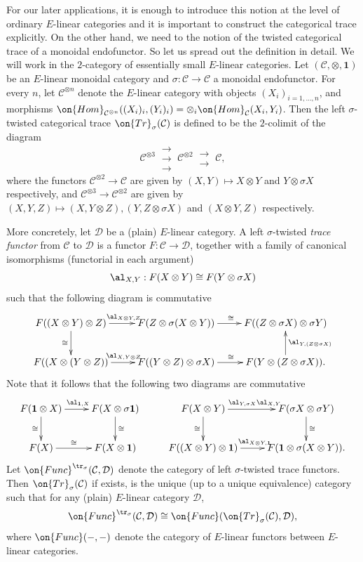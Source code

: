 \documentclass[11pt]{amsart}
\theoremstyle{definition}
\theoremstyle{definition}
\theoremstyle{definition}
\numberwithin{equation}{subsection}
\newcommand{\mC}{{\mathcal C}}
\newcommand{\mD}{{\mathcal D}}
\newcommand{\Hom}{{\on{Hom}}}
\newcommand{\Tr}{{\on{Tr}}}
\begin{document}
For our later applications, it is enough to introduce this notion at the level of ordinary $E$-linear categories and it is important to construct the categorical trace explicitly. On the other hand, we need to the notion of the twisted categorical trace of
a monoidal endofunctor. So let us spread out the definition in detail. We will work in the $2$-category of essentially small $E$-linear categories.  
Let $(\mC,\otimes,\mathbf{1})$ be an $E$-linear monoidal category and  $\sigma: \mC\to \mC$ a monoidal endofunctor. For every $n$, let
$\mC^{\otimes n}$ denote the $E$-linear category with objects $(X_i)_{i=1,\ldots,n}$, and morphisms $\Hom_{\mC^{\otimes n}}((X_i)_i, (Y_i)_i)=\otimes_i \Hom_\mC(X_i,Y_i)$. Then the left $\sigma$-twisted categorical trace $\Tr_\sigma(\mC)$ is defined to be the $2$-colimit of the diagram
\[
\mC^{\otimes 3}\ \substack{\longrightarrow\\[-1em] \longrightarrow\\[-1em] \longrightarrow} \ \mC^{\otimes 2}\ \substack{\longrightarrow\\[-1em] \longrightarrow} \ \mC,
\]
where the functors $\mC^{\otimes 2}\to \mC$ are given by $(X,Y)\mapsto X\otimes Y$ and $Y\otimes \sigma X$ respectively, and $\mC^{\otimes 3}\to \mC^{\otimes 2}$ are given by $(X,Y,Z)\mapsto (X,Y\otimes Z), (Y, Z\otimes \sigma X)$ and $(X\otimes Y,Z)$ respectively.

More concretely, let $\mD$ be a (plain) $E$-linear category.
A left $\sigma$-twisted \emph{trace functor} from $\mC$ to $\mD$ is a functor $F:\mC\to\mD$, together with a family of canonical isomorphisms (functorial in each argument)
\[\al_{X,Y}: F(X\otimes Y)\cong F(Y\otimes \sigma X)\]
such that the following diagram is commutative
\begin{equation}
\label{E:cond trace}
\xymatrix{
F((X\otimes Y)\otimes Z)\ar^{\al_{X\otimes Y,Z}}[r]\ar_\cong[d] & F(Z\otimes \sigma (X\otimes Y))\ar^{\cong}[r]&  F((Z\otimes \sigma X)\otimes \sigma Y)  \\
F((X\otimes (Y\otimes Z))\ar^{\al_{X,Y\otimes Z}}[r] & F((Y\otimes Z)\otimes \sigma X)\ar^{\cong}[r]&  F(Y\otimes (Z\otimes \sigma X)). \ar_{\al_{Y,(Z\otimes\sigma X)}}[u]
}
\end{equation}
Note that it follows that the following two diagrams are commutative
\begin{equation}
\label{E:cond trace cor}
\xymatrix{
F(\mathbf{1}\otimes X)\ar_{\cong}[d]\ar^{\al_{\mathbf{1},X}}[r]& F(X\otimes \sigma\mathbf{1})\ar^\cong[d]&  F(X\otimes Y)\ar^{\al_{Y,\sigma X}\al_{X,Y}}[r]\ar_\cong[d]& F(\sigma X\otimes \sigma Y)\ar^\cong[d]\\
 F(X)\ar^-\cong[r]& F(X\otimes \mathbf{1})&  F((X\otimes Y)\otimes\mathbf{1})\ar^{\al_{X\otimes Y,\mathbf{1}}} [r]& F(\mathbf{1}\otimes\sigma(X\otimes Y)).
}\end{equation}
Let $\on{Func}^{\tr_\sigma}(\mC,\mD)$ denote the category of left $\sigma$-twisted trace functors.  Then $\Tr_\sigma(\mC)$ if exists, is the unique  (up to a unique equivalence) category such that for any (plain) $E$-linear category $\mD$,
\[\on{Func}^{\tr_\sigma}(\mC,\mD)\cong \on{Func}(\Tr_\sigma(\mC),\mD),\]
where $\on{Func}(-,-)$ denote the category of $E$-linear functors between $E$-linear categories.
\end{document}
